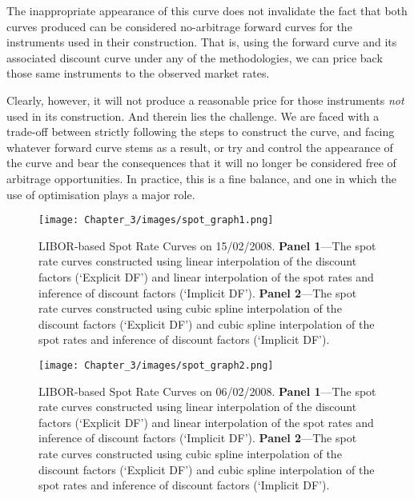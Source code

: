 The inappropriate appearance of this curve does not invalidate the fact that both curves produced can be considered no-arbitrage forward curves for the instruments used in their construction. That is, using the forward curve and its associated discount curve under any of the methodologies, we can price back those same instruments to the observed market rates.

Clearly, however, it will not produce a reasonable price for those instruments \textit{not} used in its construction. And therein lies the challenge. We are faced with a trade-off between strictly following the steps to construct the curve, and facing whatever forward curve stems as a result, or try and control the appearance of the curve and bear the consequences that it will no longer be considered free of arbitrage opportunities. In practice, this is a fine balance, and one in which the use of optimisation plays a major role. 

\begin{figure}[ht]
\begin{center}
\texttt{[image: Chapter\_3/images/spot\_graph1.png]}
\caption[LIBOR-based Spot Rate Curves using different construction techniques on 15/02/2008]{LIBOR-based Spot Rate Curves on 15/02/2008. \textbf{Panel 1}––The spot rate curves constructed using linear interpolation of the discount factors (`Explicit DF') and linear interpolation of the spot rates and inference of discount factors (`Implicit DF'). \textbf{Panel 2}––The spot rate curves constructed using cubic spline interpolation of the discount factors (`Explicit DF') and cubic spline interpolation of the spot rates and inference of discount factors (`Implicit DF').}
\label{fig:curves_1}
\end{center}
\end{figure}

\begin{figure}[ht]
\begin{center}
\texttt{[image: Chapter\_3/images/spot\_graph2.png]}
\caption[LIBOR-based Spot Rate Curves using different construction techniques on 06/02/2008]{LIBOR-based Spot Rate Curves on 06/02/2008. \textbf{Panel 1}––The spot rate curves constructed using linear interpolation of the discount factors (`Explicit DF') and linear interpolation of the spot rates and inference of discount factors (`Implicit DF'). \textbf{Panel 2}––The spot rate curves constructed using cubic spline interpolation of the discount factors (`Explicit DF') and cubic spline interpolation of the spot rates and inference of discount factors (`Implicit DF').}
\label{fig:curves_2}
\end{center}
\end{figure}


